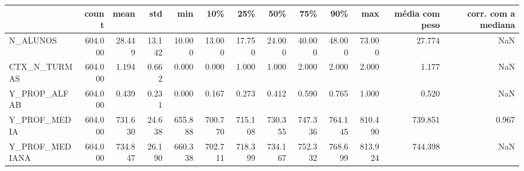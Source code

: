 \begin{tabular}{lrrrrrrrrrrrr}
\toprule
 & count & mean & std & min & 10\% & 25\% & 50\% & 75\% & 90\% & max & média com peso & corr. com a mediana \\
\midrule
N\_ALUNOS & 604.000 & 28.449 & 13.142 & 10.000 & 13.000 & 17.750 & 24.000 & 40.000 & 48.000 & 73.000 & 27.774 & NaN \\
CTX\_N\_TURMAS & 604.000 & 1.194 & 0.662 & 0.000 & 0.000 & 1.000 & 1.000 & 2.000 & 2.000 & 2.000 & 1.177 & NaN \\
Y\_PROP\_ALFAB & 604.000 & 0.439 & 0.231 & 0.000 & 0.167 & 0.273 & 0.412 & 0.590 & 0.765 & 1.000 & 0.520 & NaN \\
Y\_PROF\_MEDIA & 604.000 & 731.630 & 24.638 & 655.888 & 700.770 & 715.108 & 730.355 & 747.336 & 764.145 & 810.490 & 739.851 & 0.967 \\
Y\_PROF\_MEDIANA & 604.000 & 734.847 & 26.190 & 660.338 & 702.711 & 718.399 & 734.167 & 752.332 & 768.699 & 813.924 & 744.398 & NaN \\
\bottomrule
\end{tabular}
